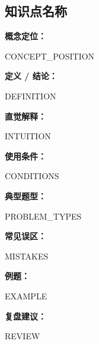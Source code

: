 \subsection{知识点名称}
\par

\begin{knowledgeBox}
\textbf{概念定位：}

{{CONCEPT_POSITION}}

\textbf{定义 / 结论：}

{{DEFINITION}}

\textbf{直觉解释：}

{{INTUITION}}

\textbf{使用条件：}

{{CONDITIONS}}

\textbf{典型题型：}

{{PROBLEM_TYPES}}

\textbf{常见误区：}

{{MISTAKES}}

\textbf{例题：}

{{EXAMPLE}}

\textbf{复盘建议：}

{{REVIEW}}
\end{knowledgeBox}
